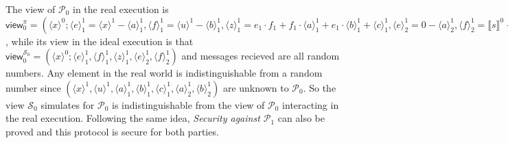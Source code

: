 \documentclass[letterpaper]{article} %
\begin{document}
    The view of $\mathcal{P}_{0}$ in the real execution is $\mathsf{view}_{0}^{\pi}=(\langle x\rangle ^{0};
    \langle e\rangle_{1}^{1}=\langle x\rangle^{1}-\langle a\rangle_{1}^{1},
    \langle f\rangle_{1}^{1}=\langle u\rangle^{1}-\langle b\rangle_{1}^{1},
    \langle z\rangle_{1}^{1} = e_{1} \cdot f_{1} + f_{1}\cdot \langle a\rangle_{1}^{1}
    +e_{1} \cdot \langle b\rangle^{1}_{1} + \langle c\rangle^{1}_{1},
    \langle e\rangle_{2}^{1}=0-\langle a\rangle_{2}^{1},
    \langle f\rangle_{2}^{1}=\llbracket s \rrbracket^{0}-\langle b\rangle_{2}^{1})$,
    while its view in the ideal execution is that
    $\mathsf{view}_{0}^{\mathcal{S}_{0}}=(\langle x\rangle ^{0};
    \langle e\rangle_{1}^{1},
    \langle f\rangle_{1}^{1},
    \langle z\rangle_{1}^{1},
    \langle e\rangle_{2}^{1},
    \langle f\rangle_{2}^{1})$
    and messages recieved are all random numbers.
    Any element in the real world
    is indistinguishable from a random number since
    $(\langle x\rangle^{1},\langle u\rangle^{1},
    \langle a\rangle_{1}^{1},\langle b\rangle_{1}^{1},\langle c\rangle^{1}_{1},
    \langle a\rangle_{2}^{1},\langle b\rangle_{2}^{1})$ are unknown to $\mathcal{P}_{0}$.
    So the view $\mathcal{S}_{0}$ simulates for $\mathcal{P}_{0}$ is indistinguishable
    from the view of $\mathcal{P}_{0}$ interacting in the real execution.
    Following the same idea, \emph{Security against $\mathcal{P}_{1}$} can also be proved and
    this protocol is secure for both parties. \rightline{$\square$ }
\end{document}

